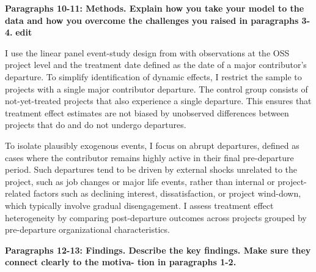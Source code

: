 \documentclass[12pt,notitlepage]{article}
\begin{document}
\textbf{Paragraphs 10-11: Methods. Explain how you take your model to the data and how you overcome the
challenges you raised in paragraphs 3-4.}
\textbf{edit}

I use the linear panel event-study design from \cite{freyaldenhoven_visualization_2021} with observations at the OSS project level and the treatment date defined as the date of a major contributor's departure. To simplify identification of dynamic effects, I restrict the sample to projects with a single major contributor departure. The control group consists of not-yet-treated projects that also experience a single departure. This ensures that treatment effect estimates are not biased by unobserved differences between projects that do and do not undergo departures.

To isolate plausibly exogenous events, I focus on abrupt departures, defined as cases where the contributor remains highly active in their final pre-departure period. Such departures tend to be driven by external shocks unrelated to the project, such as job changes or major life events, rather than internal or project-related factors such as declining interest, dissatisfaction, or project wind-down, which typically involve gradual disengagement. I assess treatment effect heterogeneity by comparing post-departure outcomes across projects grouped by pre-departure organizational characteristics.

\textbf{Paragraphs 12-13: Findings. Describe the key findings. Make sure they connect clearly to the motiva-
tion in paragraphs 1-2.}
\end{document}
